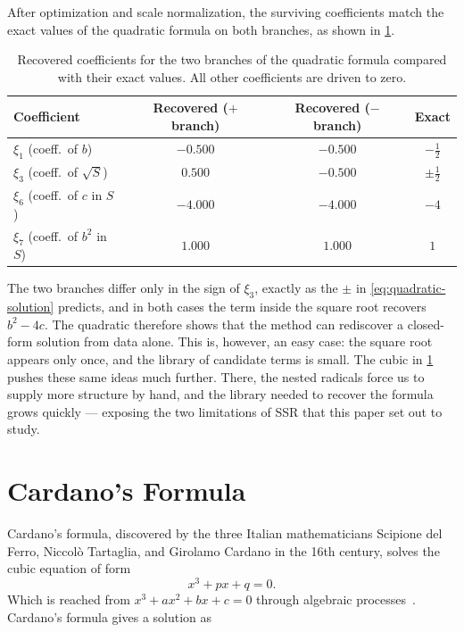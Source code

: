 \documentclass[11pt]{article}
\theoremstyle{plain}
\theoremstyle{definition}
\begin{document}
After optimization and scale normalization, the surviving coefficients match the exact values of the quadratic formula on both branches, as shown in \cref{tab:quadratic-coeffs}.
\begin{table}[!ht]
\centering
\caption{Recovered coefficients for the two branches of the quadratic
formula compared with their exact values. All other coefficients are
driven to zero.}
\label{tab:quadratic-coeffs}
\begin{tabular}{lccc}
\toprule
Coefficient & Recovered ($+$ branch) & Recovered ($-$ branch) & Exact \\
\midrule
$\xi_1$ (coeff.\ of $b$)           & $-0.500$ & $-0.500$ & $-\tfrac{1}{2}$ \\
$\xi_3$ (coeff.\ of $\sqrt{S}$)    & $0.500$ & $-0.500$ & $\pm\tfrac{1}{2}$ \\
$\xi_6$ (coeff.\ of $c$ in $S$)    & $-4.000$ & $-4.000$ & $-4$            \\
$\xi_7$ (coeff.\ of $b^2$ in $S$)  & $1.000$  & $1.000$  & $1$             \\
\bottomrule
\end{tabular}
\end{table}

The two branches differ only in the sign of $\xi_3$, exactly as the
$\pm$ in \cref{eq:quadratic-solution} predicts, and in both cases the term
inside the square root recovers $b^2 - 4c$. The quadratic therefore shows
that the method can rediscover a closed-form solution from data alone. This is, however, an easy case: the square root appears only once, and the
library of candidate terms is small. The cubic in \cref{sec:cardano} pushes these same ideas much further. There, the nested radicals force us to supply more structure by hand, and the library needed to recover the formula grows quickly — exposing the two limitations of SSR that this paper set out to study.

\section{Cardano's Formula}\label{sec:cardano}
Cardano's formula, discovered by the three Italian mathematicians Scipione del Ferro, Niccolò Tartaglia, and Girolamo Cardano in the 16th century, solves the cubic equation of form
\begin{equation}
\label{eq:depressed-cubic}
x^3 + px + q = 0.
\end{equation}
Which is reached from $x^3 + ax^2 + bx + c = 0$ through algebraic processes~\cite{quanta2022cubic}.
Cardano's formula gives a solution as
\end{document}
